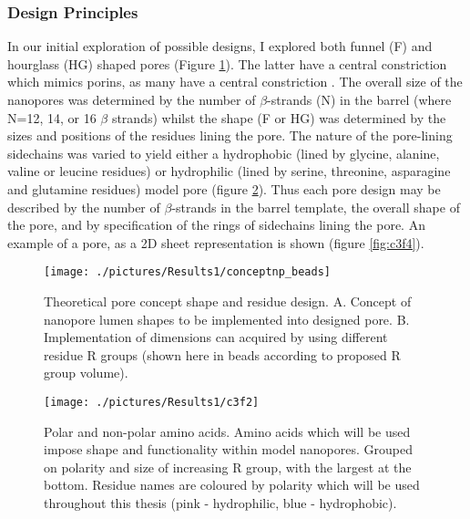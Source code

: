 \subsubsection*{Design Principles}
In our initial exploration of possible designs, I explored both funnel (F) and hourglass (HG) shaped pores (Figure \ref{fig:conceptnp_beads}). The latter have a central constriction which mimics porins, as many have a central constriction \cite{Cowan1992b,Schirmer1995c,Biswas2008c}. The overall size of the nanopores was determined by the number of $\beta$-strands (N) in the barrel (where N=12, 14, or 16 $\beta$ strands) whilst the shape (F or HG) was determined by the sizes and positions of the residues lining the pore. The nature of the pore-lining sidechains was varied to yield either a hydrophobic (lined by glycine, alanine, valine or leucine residues) or hydrophilic (lined by serine, threonine, asparagine and glutamine residues) model pore (figure \ref{fig:c3f2}). Thus each pore design may be described by the number of $\beta$-strands in the barrel template, the overall shape of the pore, and by specification of the rings of sidechains lining the pore. An example of a pore, as a 2D sheet representation is shown (figure \ref{fig:c3f4}).

\begin{figure}[H]
\begin{center}
\texttt{[image: ./pictures/Results1/conceptnp\_beads]}
\caption[Theoretical pore concept shape and residue design.] {Theoretical pore concept shape and residue design. A. Concept of nanopore lumen shapes to be implemented into designed pore. B. Implementation of dimensions can acquired by using different residue R groups (shown here in beads according to proposed R group volume).} %
\label{fig:conceptnp_beads}
\end{center}
\end{figure}

\begin{figure}[H]
\begin{center}
\texttt{[image: ./pictures/Results1/c3f2]}
\caption[Polar and non-polar amino acids.] {Polar and non-polar amino acids. Amino acids which will be used impose shape and functionality within model nanopores. Grouped on polarity and size of increasing R group, with the largest at the bottom. Residue names are coloured by polarity which will be used throughout this thesis (pink - hydrophilic, blue - hydrophobic).}
\label{fig:c3f2}
\end{center}
\end{figure}


